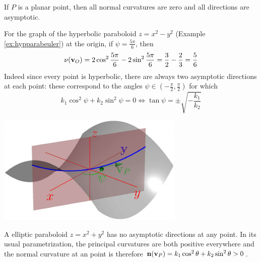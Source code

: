 \begin{examples}{}{}
\exstart If $P$ is a planar point, then all normal curvatures are zero and all directions are asymptotic.
\begin{enumerate}\setcounter{enumi}{1}
\begin{minipage}[t]{0.6\linewidth}\vspace{0pt}
  \item For the graph of the hyperbolic paraboloid $z=x^2-y^2$ (Example \ref{ex:hypparabeuler}) at the origin, if $\psi=\frac{5\pi}6$, then
	\[
	\nu(\vv_O)=2\cos^2\frac{5\pi}6-2\sin^2\frac{5\pi}6=\frac 32-\frac 23=\frac 56 %
	\]
	Indeed since every point is hyperbolic, there are always two asymptotic directions at each point: these correspond to the angles $\psi\in(-\frac\pi 2,\frac\pi 2)$ for which 
	\[k_1\cos^2\psi+k_2\sin^2\psi=0\iff \tan\psi=\pm\sqrt{-\frac{k_1}{k_2}}\]
\end{minipage}\hfill\begin{minipage}[t]{0.39\linewidth}\vspace{0pt}
  \flushright	\flushright\href{http://www.math.uci.edu/~ndonalds/math162a/euler-setup2.html}{\includegraphics{euler-setup2}}
\end{minipage}\par

  \item A elliptic paraboloid $z=x^2+y^2$ has no asymptotic directions at any point. In its usual parametrization, the principal curvatures are both positive everywhere and  the normal curvature at an point is therefore ${\mathbf{n}}({\mathbf{v}}_P)=k_1\cos^2\theta+k_2\sin^2\theta>0$.

\end{enumerate}
\end{examples}

